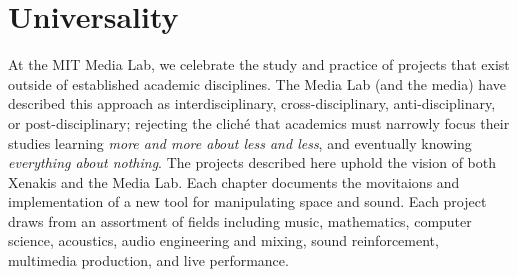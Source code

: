 \section{Universality}
\label{sec:universality}
At the MIT Media Lab, we celebrate the study and practice of projects
that exist outside of established academic disciplines. The Media Lab
(and the media) have described this approach as interdisciplinary,
cross-disciplinary, anti-disciplinary, or post-disciplinary; rejecting
the clich\'{e} that academics must narrowly focus their studies
learning \textit{more and more about less and less}, and eventually
knowing \textit{everything about nothing}.  The projects described
here uphold the vision of both Xenakis and the Media Lab. Each chapter
documents the movitaions and implementation of a new tool for
manipulating space and sound. Each project draws from an assortment of
fields including music, mathematics, computer science, acoustics,
audio engineering and mixing, sound reinforcement, multimedia
production, and live performance. 






